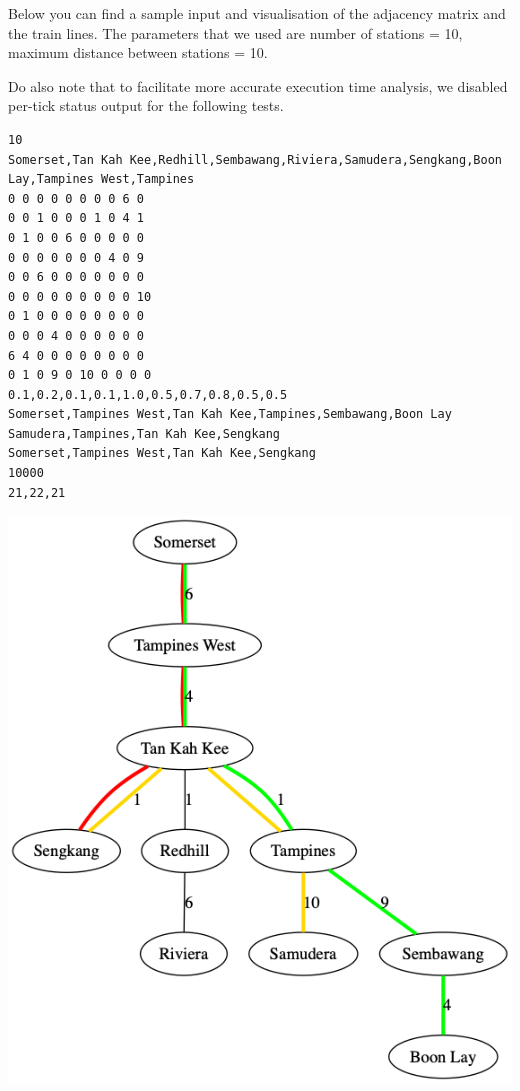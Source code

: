 \documentclass[a4paper,12pt]{article}
\begin{document}
Below you can find a sample input and visualisation of the adjacency matrix and the train lines. The parameters that we used are number of stations = 10, maximum distance between stations = 10.

Do also note that to facilitate more accurate execution time analysis, we disabled per-tick status output for the following tests.

\begin{center}
	\begin{verbatim}
10
Somerset,Tan Kah Kee,Redhill,Sembawang,Riviera,Samudera,Sengkang,Boon Lay,Tampines West,Tampines
0 0 0 0 0 0 0 0 6 0
0 0 1 0 0 0 1 0 4 1
0 1 0 0 6 0 0 0 0 0
0 0 0 0 0 0 0 4 0 9
0 0 6 0 0 0 0 0 0 0
0 0 0 0 0 0 0 0 0 10
0 1 0 0 0 0 0 0 0 0
0 0 0 4 0 0 0 0 0 0
6 4 0 0 0 0 0 0 0 0
0 1 0 9 0 10 0 0 0 0
0.1,0.2,0.1,0.1,1.0,0.5,0.7,0.8,0.5,0.5
Somerset,Tampines West,Tan Kah Kee,Tampines,Sembawang,Boon Lay
Samudera,Tampines,Tan Kah Kee,Sengkang
Somerset,Tampines West,Tan Kah Kee,Sengkang
10000
21,22,21
		\end{verbatim}
\end{center}

\begin{center}
	\includegraphics[width=0.5\linewidth]{map}
\end{center}

\newpage
\end{document}
